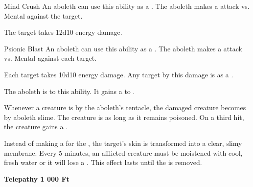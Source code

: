    \begin{freeability}{Mind Crush}
      An aboleth can use this ability as a . The aboleth makes a  attack
        vs. Mental against the target.
    
    \hit The target takes 12d10 energy damage.
    \end{freeability}
  

    \begin{freeability}{Psionic Blast}
      An aboleth can use this ability as a . The aboleth makes a  attack
        vs. Mental against each target.
    
    \hit Each target takes 10d10 energy damage. Any target  by this damage is  as a .
    \end{freeability}
  
      
        The aboleth is  to this ability.
        It gains a   to .
      
        Whenever a creature is  by the aboleth's tentacle,
          the damaged creature becomes  by aboleth slime.
        The creature is  as long as it remains poisoned.
        On a third hit, the creature gains a .

        Instead of making a  for the ,
          the target's skin is transformed into a clear, slimy membrane.
        Every 5 minutes, an afflicted creature must be moistened with cool, fresh water
          or it will lose a .
        This effect lasts until the  is removed.
      
    \par \textbf{Telepathy 1 000 Ft}
  
